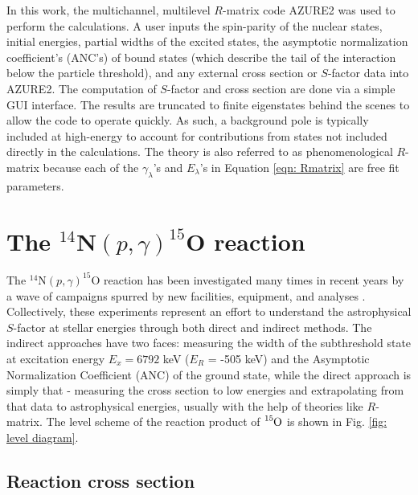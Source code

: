 In this work, the multichannel, multilevel $R$-matrix code AZURE2 \cite{Azuma2010} was used to perform the calculations. A user inputs the spin-parity of the nuclear states, initial energies, partial widths of the excited states, the asymptotic normalization coefficient's (ANC's) of bound states (which describe the tail of the interaction below the particle threshold), and any external cross section or $S$-factor data into AZURE2. The computation of $S$-factor and cross section are done via a simple GUI interface. The results are truncated to finite eigenstates behind the scenes to allow the code to operate quickly. As such, a background pole is typically included at high-energy to account for contributions from states not included directly in the calculations. The theory is also referred to as phenomenological $R$-matrix because each of the $\gamma_{\lambda}$'s and $E_{\lambda}$'s in Equation \ref{eqn: Rmatrix} are free fit parameters. 





\section{The $^{14}$N$\left( p,\gamma \right) ^{15}$O reaction}
\label{sec: 14N(p,g)}

The $^{14}$N$\left( p,\gamma \right) ^{15}$O reaction has been investigated many times in recent years by a wave of campaigns spurred by new facilities, equipment, and analyses \cite{Schroder1987, Bertone2001, Bertone2002, Formicola2004, Yamada2004, Imbriani2004, Imbriani2005, Runkle2005, Bemmerer2006, Lemut2006, Schurmann2008, Marta2008, Marta2010, Marta2011, Michelagnoli2013, Galinski2014, Szucs2015, Daigle2016, Li2016, Wagner2018}. Collectively, these experiments represent an effort to understand the astrophysical $S$-factor at stellar energies through both direct and indirect methods. The indirect approaches have two faces: measuring the width of the subthreshold state at excitation energy $E_{x} =6792$ keV ($E_{R}$ = -505 keV) and the Asymptotic Normalization Coefficient (ANC) of the ground state, while the direct approach is simply that - measuring the cross section to low energies and extrapolating from that data to astrophysical energies, usually with the help of theories like $R$-matrix. The level scheme of the reaction product of $\ce{^{15}O}$ is shown in Fig. \ref{fig: level diagram}.

\subsection{Reaction cross section}

